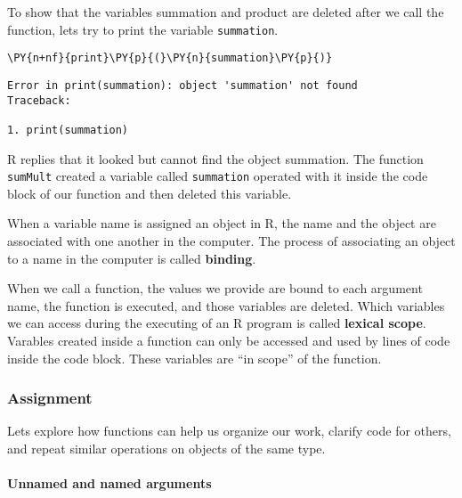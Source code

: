 To show that the variables summation and product are deleted after we
call the function, lets try to print the variable \texttt{summation}.

    \begin{tcolorbox}[breakable, size=fbox, boxrule=1pt, pad at break*=1mm,colback=cellbackground, colframe=cellborder]
\begin{Verbatim}[commandchars=\\\{\}]
\PY{n+nf}{print}\PY{p}{(}\PY{n}{summation}\PY{p}{)}
\end{Verbatim}
\end{tcolorbox}

    \begin{Verbatim}[commandchars=\\\{\}, frame=single, framerule=2mm, rulecolor=\color{outerrorbackground}]
Error in print(summation): object 'summation' not found
Traceback:

1. print(summation)
    \end{Verbatim}

    R replies that it looked but cannot find the object summation. The
function \texttt{sumMult} created a variable called \texttt{summation}
operated with it inside the code block of our function and then deleted
this variable.

When a variable name is assigned an object in R, the name and the object
are associated with one another in the computer. The process of
associating an object to a name in the computer is called
\textbf{binding}.

When we call a function, the values we provide are bound to each
argument name, the function is executed, and those variables are
deleted. Which variables we can access during the executing of an R
program is called \textbf{lexical scope}. Varables created inside a
function can only be accessed and used by lines of code inside the code
block. These variables are ``in scope'' of the function.

    \hypertarget{assignment}{%
\subsubsection{Assignment}\label{assignment}}

Lets explore how functions can help us organize our work, clarify code
for others, and repeat similar operations on objects of the same type.

\hypertarget{unnamed-and-named-arguments}{%
\paragraph{Unnamed and named
arguments}\label{unnamed-and-named-arguments}}

